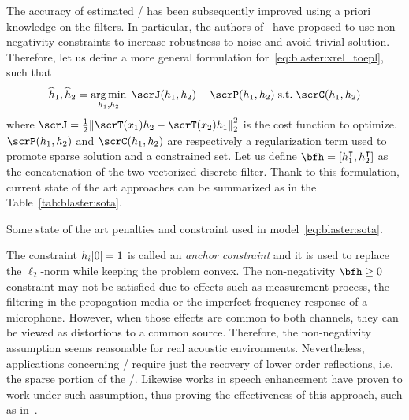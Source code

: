 \mynewline
The accuracy of estimated \RIRs/ has been subsequently improved using a priori knowledge on the filters.
In particular, the authors of~ have proposed to use non-negativity constraints to increase robustness to noise and avoid trivial solution.
Therefore, let us define a more general formulation for~\cref{eq:blaster:xrel_toepl}, such that
\begin{equation}\label{eq:blaster:sota}
    \disFilterHat_1, \disFilterHat_2
    =
    \kargmin_{\disFilter_1, \disFilter_2}
    \;
    \scrJ(\disFilter_1, \disFilter_2) + \scrP(\disFilter_1, \disFilter_2)
    \;\text{s.t.}\;
    \scrC(\disFilter_1, \disFilter_2)
\end{equation}
where $\scrJ = \tfrac{1}{2} \kvvbar{\scrT(\disRecordedSignal_1) \disFilter_2 - \scrT(\disRecordedSignal_2) \disFilter_1}_2^2$ is the cost function to optimize.
$\scrP(\disFilter_1, \disFilter_2)$ and $\scrC(\disFilter_1, \disFilter_2)$ are respectively a regularization term used to promote sparse solution and a constrained set.
Let us define $\bfh = \klist{h_1^\intercal, h_2^\intercal}$ as the concatenation of the two vectorized discrete filter.
Thank to this formulation, current state of the art approaches can be summarized as in the Table~\cref{tab:blaster:sota}.

\begin{table}[!h]

    \begin{fullwidth}
        \centering
        \small
        

        \caption{Some state of the art penalties and constraint used in model~\cref{eq:blaster:sota}.}
        \label{tab:blaster:sota}
    \end{fullwidth}
\end{table}

\mynewline
The constraint $h_i[0]=1$ is called an \textit{anchor constraint} and it is used to replace the $\ell_2$-norm while keeping the problem convex.
The non-negativity $\bfh \geq 0$ constraint may not be satisfied due to effects such as measurement process, the filtering in the propagation media or the imperfect frequency response of a microphone.
However, when those effects are common to both channels, they can be viewed as distortions to a common source.
Therefore, the non-negativity assumption seems reasonable for real acoustic environments.
Nevertheless, applications concerning \RooGE/ require just the recovery of lower order reflections, i.e. the sparse portion of the \RIR/.
Likewise works in speech enhancement have proven to work under such assumption, thus proving the effectiveness of this approach, such as in~.

